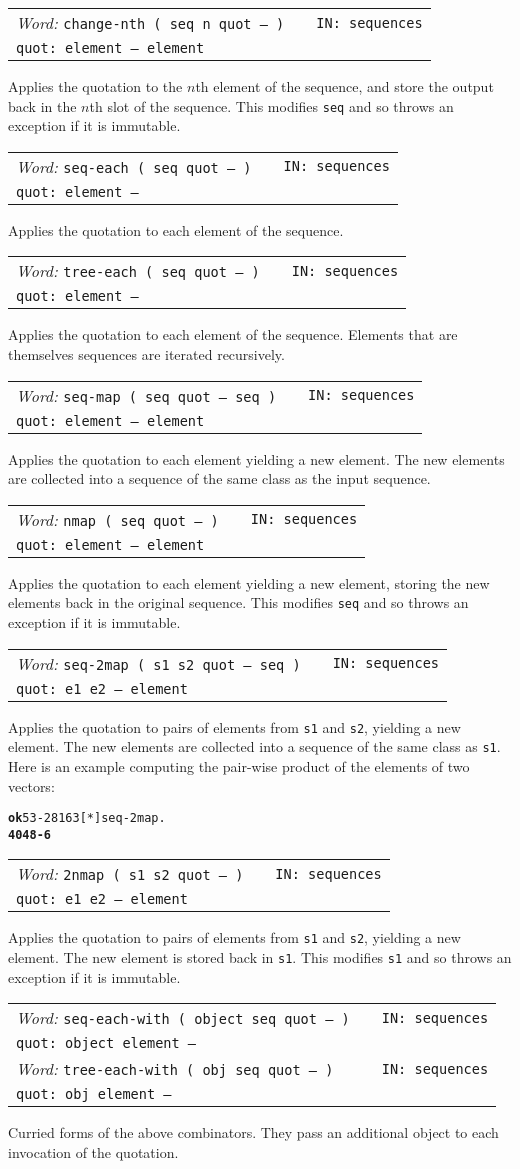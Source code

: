 \documentclass{report}
\newcommand{\tto}{\symbol{123}}
\newcommand{\ttc}{\symbol{125}}
\newcommand{\ordinaryword}[3]{\index{#1}
\emph{Word:} \texttt{#2} &&\texttt{IN: #3}}
\newcommand{\wordtable}[1]{

\begin{tabularx}{12cm}[t]{lXr}
\hline
#1\\
\hline
\end{tabularx}

}
\begin{document}
\wordtable{
\ordinaryword{change-nth}{change-nth ( seq n quot -- )}{sequences}\\
\texttt{quot:~element -- element}
}
Applies the quotation to the $n$th element of the sequence, and store the output back in the $n$th slot of the sequence. This modifies \texttt{seq} and so throws an exception if it is immutable.
\wordtable{
\ordinaryword{seq-each}{seq-each ( seq quot -- )}{sequences}\\
\texttt{quot:~element --}
}
Applies the quotation to each element of the sequence.
\wordtable{
\ordinaryword{tree-each}{tree-each ( seq quot -- )}{sequences}\\
\texttt{quot:~element --}
}
Applies the quotation to each element of the sequence. Elements that are themselves sequences are iterated recursively.
\wordtable{
\ordinaryword{seq-map}{seq-map ( seq quot -- seq )}{sequences}\\
\texttt{quot:~element -- element}
}
Applies the quotation to each element yielding a new element. The new elements are collected into a sequence of the same class as the input sequence.
\wordtable{
\ordinaryword{nmap}{nmap ( seq quot -- )}{sequences}\\
\texttt{quot:~element -- element}
}
Applies the quotation to each element yielding a new element, storing the new elements back in the original sequence. This modifies \texttt{seq} and so throws an exception if it is immutable.
\wordtable{
\ordinaryword{seq-2map}{seq-2map ( s1 s2 quot -- seq )}{sequences}\\
\texttt{quot:~e1 e2 -- element}
}
Applies the quotation to pairs of elements from \texttt{s1} and \texttt{s2}, yielding a new element. The new elements are collected into a sequence of the same class as \texttt{s1}. Here is an example computing the pair-wise product of the elements of two vectors:
\begin{alltt}
\textbf{ok} \tto 5 3 -2 \ttc \tto 8 16 3 \ttc [ * ] seq-2map .
\textbf{\tto 40 48 -6 \ttc}
\end{alltt}
\wordtable{
\ordinaryword{2nmap}{2nmap ( s1 s2 quot -- )}{sequences}\\
\texttt{quot:~e1 e2 -- element}
}
Applies the quotation to pairs of elements from \texttt{s1} and \texttt{s2}, yielding a new element. The new element is stored back in \texttt{s1}. This modifies \texttt{s1} and so throws an exception if it is immutable.
\wordtable{
\ordinaryword{seq-each-with}{seq-each-with ( object seq quot -- )}{sequences}\\
\texttt{quot:~object element --}\\
\ordinaryword{tree-each-with}{tree-each-with ( obj seq quot -- )}{sequences}\\
\texttt{quot:~obj element --}
}
Curried forms of the above combinators. They pass an additional object to each invocation of the quotation.
\end{document}
